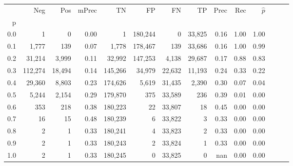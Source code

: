 \begin{tabular}{rrrrrrrrrrrrrr}
\toprule
{} &      Neg &     Pos & mPrec &       TN &       FP &      FN &      TP &  Prec &   Rec & $\hat{p}$ \\
p   &          &         &       &          &          &         &         &       &       &           \\
\midrule
0.0 &        1 &       0 &  0.00 &        1 &  180,244 &       0 &  33,825 &  0.16 &  1.00 &      1.00 \\
0.1 &    1,777 &     139 &  0.07 &    1,778 &  178,467 &     139 &  33,686 &  0.16 &  1.00 &      0.99 \\
0.2 &   31,214 &   3,999 &  0.11 &   32,992 &  147,253 &   4,138 &  29,687 &  0.17 &  0.88 &      0.83 \\
0.3 &  112,274 &  18,494 &  0.14 &  145,266 &   34,979 &  22,632 &  11,193 &  0.24 &  0.33 &      0.22 \\
0.4 &   29,360 &   8,803 &  0.23 &  174,626 &    5,619 &  31,435 &   2,390 &  0.30 &  0.07 &      0.04 \\
0.5 &    5,244 &   2,154 &  0.29 &  179,870 &      375 &  33,589 &     236 &  0.39 &  0.01 &      0.00 \\
0.6 &      353 &     218 &  0.38 &  180,223 &       22 &  33,807 &      18 &  0.45 &  0.00 &      0.00 \\
0.7 &       16 &      15 &  0.48 &  180,239 &        6 &  33,822 &       3 &  0.33 &  0.00 &      0.00 \\
0.8 &        2 &       1 &  0.33 &  180,241 &        4 &  33,823 &       2 &  0.33 &  0.00 &      0.00 \\
0.9 &        2 &       1 &  0.33 &  180,243 &        2 &  33,824 &       1 &  0.33 &  0.00 &      0.00 \\
1.0 &        2 &       1 &  0.33 &  180,245 &        0 &  33,825 &       0 &   nan &  0.00 &      0.00 \\
\bottomrule
\end{tabular}
